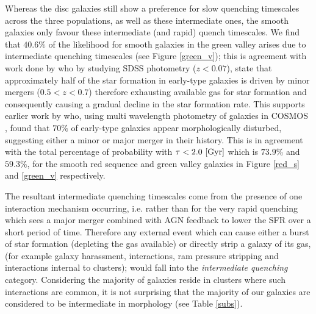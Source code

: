 \documentclass[useAMS,usenatbib]{mn2e}
\def\changed    {\color{titlecol} }
\begin{document}
Whereas the disc galaxies still show a preference for slow quenching timescales across the three populations, as well as these intermediate ones, the smooth galaxies only favour these intermediate (and rapid) quench timescales. {\changed We find that $40.6\%$ of the likelihood for smooth galaxies in the green valley arises due to intermediate quenching timescales (see Figure \ref{green_v}); this is agreement with work done by \citet{Kav14} who by studying SDSS photometry ($z<0.07$), state that approximately half of the star formation in early-type galaxies is driven by minor mergers ($0.5 < z < 0.7$) therefore exhausting available gas for star formation and consequently causing a gradual decline in the star formation rate}. This supports earlier work by \cite{Kav11} who, using multi wavelength photometry of galaxies in COSMOS \citep{Scoville07}, found that $70\%$ of early-type galaxies  appear morphologically disturbed, suggesting either a minor or major merger in their history. {\changed This is in agreement with the total percentage of probability with $\tau < 2.0 ~\rm[Gyr]$ which is $73.9\%$ and $59.3\%$, for the smooth red sequence and green valley galaxies in Figure \ref{red_s} and \ref{green_v} respectively.}

The resultant intermediate quenching timescales come from the presence of one interaction mechanism occurring, i.e. rather than for the very rapid quenching which sees a major merger combined with AGN feedback to lower the SFR over a short period of time. Therefore any external event which can cause either a burst of star formation (depleting the gas available) or directly strip a galaxy of its gas, (for example galaxy harassment, interactions, ram pressure stripping and interactions internal to clusters); would fall into the \emph{intermediate quenching} category. Considering the majority of galaxies reside in clusters where such interactions are common, it is not surprising that the majority of our galaxies are considered to be intermediate in morphology (see Table \ref{subs}).
\end{document}
